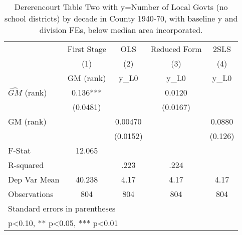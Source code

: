 \begin{table}[htbp]\centering
\def\sym#1{\ifmmode^{#1}\else\(^{#1}\)\fi}
\caption{Dererencourt Table Two with y=Number of Local Govts (no school districts) by decade in County 1940-70, with baseline y and division FEs, below median area incorporated.}
\begin{tabular}{l*{4}{c}}
\toprule
                    & First Stage   &         OLS   &Reduced Form   &        2SLS   \\
                    &\multicolumn{1}{c}{(1)}&\multicolumn{1}{c}{(2)}&\multicolumn{1}{c}{(3)}&\multicolumn{1}{c}{(4)}\\
                    &\multicolumn{1}{c}{GM  (rank)}&\multicolumn{1}{c}{y\_L0}&\multicolumn{1}{c}{y\_L0}&\multicolumn{1}{c}{y\_L0}\\
\midrule
$\hat{GM}$ (rank)   &       0.136***&               &      0.0120   &               \\
                    &    (0.0481)   &               &    (0.0167)   &               \\
\addlinespace
GM  (rank)          &               &     0.00470   &               &      0.0880   \\
                    &               &    (0.0152)   &               &     (0.126)   \\
\midrule
F-Stat              &      12.065   &               &               &               \\
R-squared           &               &        .223   &        .224   &               \\
Dep Var Mean        &      40.238   &        4.17   &        4.17   &        4.17   \\
Observations        &         804   &         804   &         804   &         804   \\
\bottomrule
\multicolumn{5}{l}{\footnotesize Standard errors in parentheses}\\
\multicolumn{5}{l}{\footnotesize * p<0.10, ** p<0.05, *** p<0.01}\\
\end{tabular}
\end{table}
